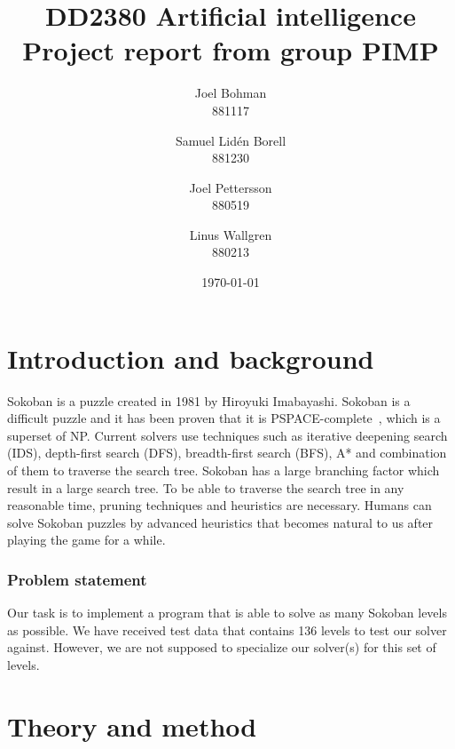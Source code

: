 \documentclass[a4paper,11pt]{article}
\title{
    {\sc DD2380 Artificial intelligence} \\
    Project report from group PIMP
}
\author{
    Joel Bohman \\ 881117 \and
    Samuel Lidén Borell \\ 881230 \and
    Joel Pettersson \\ 880519 \and
    Linus Wallgren \\ 880213
}
\date{\today}
\renewcommand{\*}[0]{\cdot}
\begin{document}
\maketitle
\thispagestyle{empty}
\newpage
\begin{abstract}
\end{abstract}
\thispagestyle{empty}
\newpage
\setcounter{page}{1}


\part*{Introduction and background}


Sokoban is a puzzle created in 1981 by Hiroyuki Imabayashi. Sokoban is a
difficult puzzle and it has been proven that it is
PSPACE-complete~\cite{culberson1997}, which is a superset of NP. Current
solvers use techniques such as iterative deepening search (IDS), depth-first
search (DFS), breadth-first search (BFS), A* and combination of them to
traverse the search tree. Sokoban has a large branching factor which result in
a large search tree. To be able to traverse the search tree in any reasonable
time, pruning techniques and heuristics are necessary. Humans can solve
Sokoban puzzles by advanced heuristics that becomes natural to us after playing
the game for a while.


\section{Problem statement}


Our task is to implement a program that is able to solve as many Sokoban levels
as possible. We have received test data that contains 136 levels to test our
solver against. However, we are not supposed to specialize our solver(s) for
this set of levels.


\part*{Theory and method}
\end{document}
